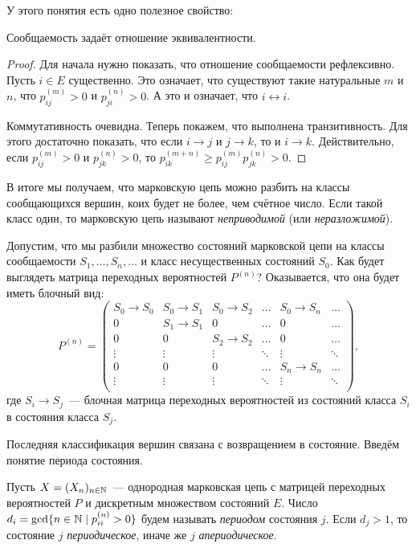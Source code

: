 У этого понятия есть одно полезное свойство:
\begin{property}
	Сообщаемость задаёт отношение эквивалентности.
\end{property}
\begin{proof}
	Для начала нужно показать, что отношение сообщаемости рефлексивно. Пусть 
	\(i \in E\) существенно. Это означает, что существуют такие натуральные 
	\(m\) и \(n\), что \(p_{ij}^{(m)} > 0\) и \(p_{ji}^{(n)} > 0\). А это и 
	означает, что \(i \leftrightarrow i\).
	
	Коммутативность очевидна. Теперь покажем, что выполнена транзитивность. Для 
	этого достаточно показать, что если \(i \to j\) и \(j \to k\), то и \(i \to 
	k\). Действительно, если \(p_{ij}^{(m)} > 0\) и \(p_{jk}^{(n)} > 0\), то 
	\(p_{ik}^{(m + n)} \geq p_{ij}^{(m)}p_{jk}^{(n)} > 0\).
\end{proof}

В итоге мы получаем, что марковскую цепь можно разбить на классы сообщающихся 
вершин, коих будет не более, чем счётное число. Если такой класс один, то 
марковскую цепь называют \emph{неприводимой} (или \emph{неразложимой}).

Допустим, что мы разбили множество состояний марковской цепи на классы 
сообщаемости \(S_{1}, \dots, S_{n}, \dots\) и класс несущественных состояний 
\(S_{0}\). Как будет выглядеть матрица переходных вероятностей \(P^{(n)}\)? 
Оказывается, что она будет иметь блочный вид:
\[
	P^{(n)} = 
	\begin{pmatrix}
	S_{0} \to S_{0} & S_{0} \to S_{1} & S_{0} \to S_{2} & \ldots & S_{0} \to 
	S_{n} & \ldots \\
	0 & S_{1} \to S_{1} & 0 & \ldots & 0 & \ldots \\
	0 & 0 & S_{2} \to S_{2} & \ldots & 0 & \ldots \\
	\vdots & \vdots & \vdots & \ddots & \vdots & \ddots \\
	0 & 0 & 0 &\ldots & S_{n} \to S_{n} & \ldots \\
	\vdots & \vdots & \vdots & \ddots & \vdots & \ddots \\
	\end{pmatrix},
\]
где \(S_{i} \to S_{j}\)~--- блочная матрица переходных вероятностей из 
состояний класса \(S_{i}\) в состояния класса \(S_{j}\).

Последняя классификация вершин связана с возвращением в состояние. Введём 
понятие периода состояния.
\begin{definition}
	Пусть \(X = (X_{n})_{n \in \mathbb{N}}\)~--- однородная марковская цепь с матрицей 
	переходных вероятностей \(P\) и дискретным множеством состояний \(E\). 
	Число \(d_{i} = \gcd\{n \in \mathbb{N} \mid p_{ii}^{(n)} > 0\}\) будем называть 
	\emph{периодом} состояния \(j\). Если \(d_{j} > 1\), то состояние \(j\) 
	\emph{периодическое}, иначе же \(j\) \emph{апериодическое}.
\end{definition}


